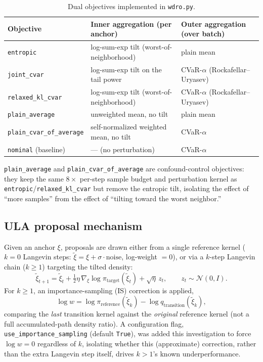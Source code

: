 \documentclass[11pt]{article}
\begin{document}
\begin{table}[h]
  \centering
  \caption{Dual objectives implemented in \texttt{wdro.py}.}
  \label{tab:objectives}
  \begin{tabular}{@{}lp{6.5cm}p{4cm}@{}}
    \toprule
    Objective & Inner aggregation (per anchor) & Outer aggregation (over batch) \\
    \midrule
    \texttt{entropic} & log-sum-exp tilt (worst-of-neighborhood) & plain mean \\
    \texttt{joint\_cvar} & log-sum-exp tilt on the tail power & CVaR-$\alpha$ (Rockafellar--Uryasev) \\
    \texttt{relaxed\_kl\_cvar} & log-sum-exp tilt (worst-of-neighborhood) & CVaR-$\alpha$ (Rockafellar--Uryasev) \\
    \texttt{plain\_average} & unweighted mean, no tilt & plain mean \\
    \texttt{plain\_cvar\_of\_average} & self-normalized weighted mean, no tilt & CVaR-$\alpha$ \\
    \texttt{nominal} (baseline) & --- (no perturbation) & CVaR-$\alpha$ \\
    \bottomrule
  \end{tabular}
\end{table}

\texttt{plain\_average} and \texttt{plain\_cvar\_of\_average} are confound-control objectives:
they keep the same $8\times$ per-step sample budget and perturbation kernel as
\texttt{entropic}/\texttt{relaxed\_kl\_cvar} but remove the entropic tilt, isolating the effect
of ``more samples'' from the effect of ``tilting toward the worst neighbor.''

\subsection{ULA proposal mechanism}

Given an anchor $\xi$, proposals are drawn either from a single reference kernel
($k=0$ Langevin steps: $\tilde\xi = \xi + \sigma \cdot \text{noise}$, log-weight $=0$), or via a
$k$-step Langevin chain ($k \ge 1$) targeting the tilted density:
\begin{equation}
  \tilde\xi_{t+1} = \tilde\xi_t + \tfrac{1}{2}\eta\,\nabla_\xi \log \pi_{\mathrm{target}}(\tilde\xi_t)
  + \sqrt{\eta}\, z_t, \qquad z_t \sim \mathcal{N}(0, I).
\end{equation}
For $k \ge 1$, an importance-sampling (IS) correction is applied,
\begin{equation}
  \log w = \log \pi_{\mathrm{reference}}(\tilde\xi_k) - \log q_{\mathrm{transition}}(\tilde\xi_k),
\end{equation}
comparing the \emph{last} transition kernel against the \emph{original} reference kernel (not a
full accumulated-path density ratio). A configuration flag,
\texttt{use\_importance\_sampling} (default \texttt{True}), was added this investigation to
force $\log w = 0$ regardless of $k$, isolating whether this (approximate) correction, rather
than the extra Langevin step itself, drives $k>1$'s known underperformance.
\end{document}
